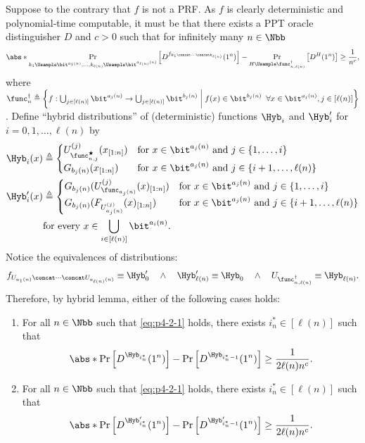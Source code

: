 \begin{answer}[b]
    Suppose to the contrary that $f$ is not a PRF. As $f$ is clearly deterministic and polynomial-time computable, it must be that there exists a PPT oracle distinguisher $D$ and $c\gt 0$ such that for infinitely many $n\in \Nbb$
    \begin{equation}\label{eq:p4-2-1}
        \abs*{\Pr_{k_1\Usample\bit^{a_1(n)},\ldots, k_{\ell(n)}\Usample\bit^{a_{\ell(n)}(n)}}\left[D^{f_{k_1\concat\cdots\concat k_{\ell(n)}}}(1^n) \right] - \Pr_{H\Usample \func_{n,\ell(n)}^\dagger}\left[D^H(1^n) \right]} 
        \ge \frac{1}{n^c},
    \end{equation}
    where $\func_{n}^\dagger\triangleq \left\{f:\bigcup_{j\in[\ell(n)]} \bit^{a_j(n)} \to \bigcup_{j\in[\ell(n)]} \bit^{b_j(n)}\biggm\vert f(x)\in\bit^{b_j(n)}\;\; \forall x\in\bit^{a_j(n)},j\in [\ell(n)]  \right\}$.
    Define ``hybrid distributions'' of (deterministic) functions $\Hyb_{i}$ and $\Hyb_{i}'$ for $i=0,1,\ldots,\ell(n)$ by
    \begin{align*}
        \Hyb_{i}(x) &\triangleq  \begin{cases}
            U_{\func_{n,j}^\bigstar}^{(j)}(x_{[1:n]}) &\textrm{for } x\in \bit^{a_j(n)} \textrm{ and } j\in\{1,\ldots, i\}\\
            G_{b_j(n)}(x_{[1:n]})  &\textrm{for } x\in \bit^{a_j(n)} \textrm{ and } j\in\{i+1,\ldots, \ell(n)\}
        \end{cases}\\
        \Hyb_i'(x) &\triangleq \begin{cases}
            G_{b_j(n)}(U_{\func_{a_j(n)}}^{(j)}(x)_{[1:n]}) &\textrm{for } x\in \bit^{a_j(n)} \textrm{ and } j\in\{1,\ldots, i\}\\
            G_{b_j(n)}(F_{U_{a_j(n)}^{(j)}}(x)_{[1:n]}) &\textrm{for } x\in \bit^{a_j(n)} \textrm{ and } j\in\{i+1,\ldots, \ell(n)\}
        \end{cases}\\
        &\textrm{for every } x\in \bigcup_{i\in[\ell(n)]} \bit^{a_i(n)}.
    \end{align*}
    Notice the equivalences of distributions:
    \[
        f_{U_{a_1(n)}\concat\cdots\concat U_{a_{\ell(n)}(n)}} \equiv  \Hyb'_0
        \quad \land \quad 
        \Hyb'_{\ell(n)}\equiv \Hyb_{0}
        \quad \land \quad 
        U_{\func_{n,\ell(n)}^\dagger} \equiv \Hyb_{\ell(n)}.
    \]
    Therefore, by hybrid lemma, either of the following cases holds:
    \begin{enumerate}[label=(\Roman*)]
        \item For all $n\in\Nbb$ such that \eqref{eq:p4-2-1} holds, there exists $i^\ast_n \in [\ell(n)]$ such that 
        \[
            \abs*{\Pr\left[D^{\Hyb_{i^\ast_n}}(1^n) \right] - \Pr\left[D^{\Hyb_{i^\ast_n-1}}(1^n) \right]} 
            \ge \frac{1}{2\ell(n)n^c}.
        \]
        \item For all $n\in\Nbb$ such that \eqref{eq:p4-2-1} holds, there exists $i^\ast_n \in [\ell(n)]$ such that
        \[
            \abs*{\Pr\left[D^{\Hyb'_{i^\ast_n}}(1^n) \right] - \Pr\left[D^{\Hyb'_{i^\ast_n-1}}(1^n) \right]} 
            \ge \frac{1}{2\ell(n)n^c}.
        \]
    \end{enumerate}


\end{answer}
